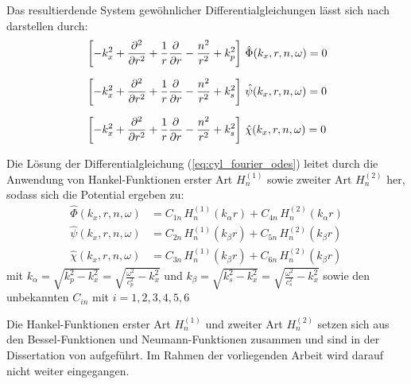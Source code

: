 Das resultierdende System gewöhnlicher Differentialgleichungen lässt sich nach \cite{Fruehe2010} darstellen durch:
\begin{subequations}\label{eq:cyl_fourier_odes}
	{%
		\begin{align}
			&\left[-k_x^{2}
			+ \frac{\partial^{2}}{\partial r^{2}}
			+ \frac{1}{r}\frac{\partial}{\partial r}
			- \frac{n^{2}}{r^{2}}
			+ k_p^{2}\right]\,
			\hat{\Phi}\!\left(k_x,r,n,\omega\right) = 0 \label{eq:13a}\\[6pt]
			&\left[-k_x^{2}
			+ \frac{\partial^{2}}{\partial r^{2}}
			+ \frac{1}{r}\frac{\partial}{\partial r}
			- \frac{n^{2}}{r^{2}}
			+ k_s^{2}\right]\,
			\hat{\psi}\!\left(k_x,r,n,\omega\right) = 0 \label{eq:13b}\\[6pt]
			&\left[-k_x^{2}
			+ \frac{\partial^{2}}{\partial r^{2}}
			+ \frac{1}{r}\frac{\partial}{\partial r}
			- \frac{n^{2}}{r^{2}}
			+ k_s^{2}\right]\,
			\hat{\chi}\!\left(k_x,r,n,\omega\right) = 0 \label{eq:13c}
		\end{align}
	}%
\end{subequations}

Die Lösung der Differentialgleichung (\ref{eq:cyl_fourier_odes}) leitet \cite{Fruehe2010} durch die Anwendung von Hankel-Funktionen erster Art $H^{(1)}_{n}$ sowie zweiter Art $H^{(2)}_{n}$ her, sodass sich die Potential ergeben zu:
\begin{subequations}\label{eq:hankel_expansions}
	\begin{align}
		\hat{\Phi}(k_x,r,n,\omega)
		&= C_{1n}\, H^{(1)}_{n}(k_{\alpha} r) + C_{4n}\, H^{(2)}_{n}(k_{\alpha} r) \label{eq:hankel_a}\\
		\hat{\psi}(k_x,r,n,\omega)
		&= C_{2n}\, H^{(1)}_{n}(k_{\beta} r) + C_{5n}\, H^{(2)}_{n}(k_{\beta} r) \label{eq:hankel_b}\\
		\hat{\chi}(k_x,r,n,\omega)
		&= C_{3n}\, H^{(1)}_{n}(k_{\beta} r) + C_{6n}\, H^{(2)}_{n}(k_{\beta} r) \label{eq:hankel_c}
	\end{align}
\end{subequations}
mit
$k_{\alpha}=\sqrt{k_{p}^{2}-k_{x}^{2}}=\sqrt{\frac{\omega^{2}}{c_{p}^{2}}-k_{x}^{2}}$ und $k_{\beta}=\sqrt{k_{s}^{2}-k_{x}^{2}}=\sqrt{\frac{\omega^{2}}{c_{s}^{2}}-k_{x}^{2}}$
sowie den unbekannten $C_{in}$ mit $i=1,2,3,4,5,6$ %

Die Hankel-Funktionen erster Art $H^{(1)}_{n}$ und zweiter Art $H^{(2)}_{n}$ setzen sich aus den Bessel-Funktionen und Neumann-Funktionen zusammen und sind in der Dissertation von \cite{Fruehe2010} aufgeführt. Im Rahmen der vorliegenden Arbeit wird darauf nicht weiter eingegangen.

